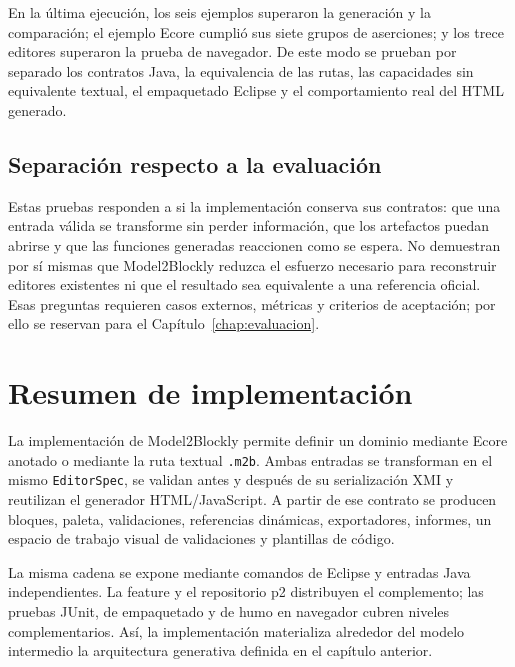 En la última ejecución, los seis ejemplos superaron la generación y la comparación;
el ejemplo Ecore cumplió sus siete grupos de aserciones; y los trece editores
superaron la prueba de navegador. De este modo se prueban por separado los
contratos Java, la equivalencia de las rutas, las capacidades sin equivalente
textual, el empaquetado Eclipse y el comportamiento real del HTML generado.

\subsection{Separación respecto a la evaluación}

Estas pruebas responden a si la implementación conserva sus contratos: que una
entrada válida se transforme sin perder información, que los artefactos puedan
abrirse y que las funciones generadas reaccionen como se espera. No demuestran
por sí mismas que Model2Blockly reduzca el esfuerzo necesario para reconstruir
editores existentes ni que el resultado sea equivalente a una referencia
oficial. Esas preguntas requieren casos externos, métricas y criterios de
aceptación; por ello se reservan para el Capítulo~\ref{chap:evaluacion}.

\section{Resumen de implementación}
\label{sec:resumen-implementacion}

La implementación de Model2Blockly permite definir un dominio mediante Ecore
anotado o mediante la ruta textual \texttt{.m2b}. Ambas entradas se transforman
en el mismo \texttt{EditorSpec}, se validan antes y después de su serialización
XMI y reutilizan el generador HTML/JavaScript. A partir de ese contrato se
producen bloques, paleta, validaciones, referencias dinámicas, exportadores,
informes, un espacio de trabajo visual de validaciones y plantillas de código.

La misma cadena se expone mediante comandos de Eclipse y entradas Java
independientes. La feature y el repositorio p2 distribuyen el complemento; las
pruebas JUnit, de empaquetado y de humo en navegador cubren niveles
complementarios. Así, la implementación materializa alrededor del modelo
intermedio la arquitectura generativa definida en el capítulo anterior.
